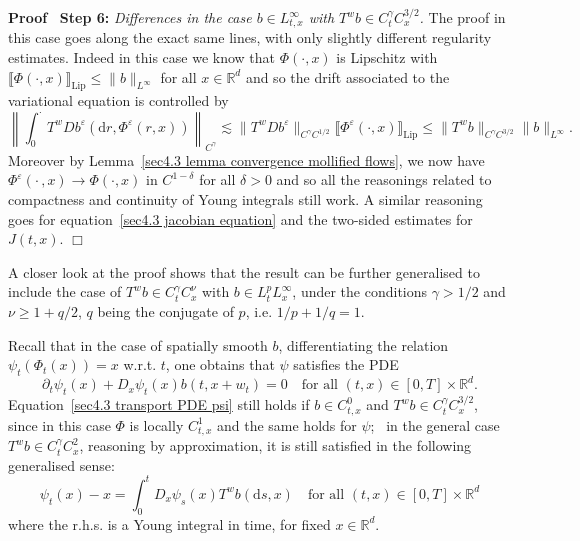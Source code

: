 \documentclass[10pt]{article}
\newcommand{\mathd}{\mathrm{d}}
\newcommand{\tmop}[1]{\ensuremath{\operatorname{#1}}}
\newcommand{\tmstrong}[1]{\textbf{#1}}
\newcommand{\tmtextit}[1]{{\itshape{#1}}}
\newenvironment{proof}{\noindent\textbf{Proof\ }}{\hspace*{\fill}$\Box$\medskip}
\begin{document}
\begin{proof}
  {\tmstrong{Step 6:}} \tmtextit{Differences in the case $b \in L^{\infty}_{t,
  x}$ with $T^w b \in C^{\gamma}_t C^{3 / 2}_x$.} The proof in this case goes
  along the exact same lines, with only slightly different regularity
  estimates. Indeed in this case we know that $\Phi (\cdot, x)$ is Lipschitz
  with $\llbracket \Phi (\cdot, x) \rrbracket_{\tmop{Lip}} \leqslant \| b
  \|_{L^{\infty}}$ for all $x \in \mathbb{R}^d$ and so the drift associated to
  the variational equation is controlled by
  \[ \left\| \int_0^{\cdot} T^w D b^{\varepsilon} (\mathd r,
     \Phi^{\varepsilon} (r, x)) \right\|_{C^{\gamma}} \lesssim \| T^w D
     b^{\varepsilon} \|_{C^{\gamma} C^{1 / 2}}  \llbracket \Phi^{\varepsilon}
     (\cdot, x) \rrbracket_{\tmop{Lip}} \leqslant \| T^w b \|_{C^{\gamma} C^{3
     / 2}}  \| b \|_{L^{\infty}} . \]
  Moreover by Lemma~\ref{sec4.3 lemma convergence mollified flows}, we now
  have $\Phi^{\varepsilon} \left( \cdot \,, x \right) \rightarrow \Phi (\cdot,
  x)$ in $C^{1 - \delta}$ for all $\delta > 0$ and so all the reasonings
  related to compactness and continuity of Young integrals still work. A
  similar reasoning goes for equation~{\eqref{sec4.3 jacobian equation}} and
  the two-sided estimates for $J (t, x)$.
\end{proof}

\begin{remark}
  A closer look at the proof shows that the result can be further generalised
  to include the case of $T^w b \in C^{\gamma}_t C^{\nu}_x$ with $b \in L^p_t
  L^{\infty}_x$, under the conditions $\gamma > 1 / 2$ and $\nu \geqslant 1 +
  q / 2$, $q$ being the conjugate of $p$, i.e. $1 / p + 1 / q = 1$.
\end{remark}

\begin{remark}
  \label{sec4.3 remark transport}Recall that in the case of spatially smooth
  $b$, differentiating the relation $\psi_t (\Phi_t (x)) = x$ w.r.t. $t$, one
  obtains that $\psi$ satisfies the PDE
  \begin{equation}
    \partial_t \psi_t (x) + D_x \psi_t (x) b (t, x + w_t) = 0 \quad \text{for
    all } (t, x) \in [0, T] \times \mathbb{R}^d . \label{sec4.3 transport PDE
    psi}
  \end{equation}
  Equation~{\eqref{sec4.3 transport PDE psi}} still holds if $b \in C^0_{t,
  x}$ and $T^w b \in C^{\gamma}_t C^{3 / 2}_x$, since in this case $\Phi$ is
  locally $C^1_{t, x}$ and the same holds for $\psi$; \ in the general case
  $T^w b \in C^{\gamma}_t C^2_x$, reasoning by approximation, it is still
  satisfied in the following generalised sense:
  \begin{equation}
    \psi_t (x) - x = \int_0^t D_x \psi_s (x) T^w b (\mathd s, x) \quad
    \text{for all } (t, x) \in [0, T] \times \mathbb{R}^d \label{sec4.3
    transport PDE psi 2}
  \end{equation}
  where the r.h.s. is a Young integral in time, for fixed $x \in
  \mathbb{R}^d$.
\end{remark}
\end{document}

